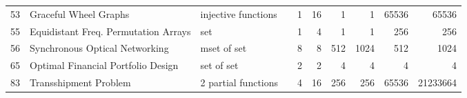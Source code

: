 \begin{sidewaystable}
\begin{center}
\begin{tabular}{r|l|l|l|r|r|r|r|r|r}
 53     &   Graceful Wheel Graphs                                           &   injective functions                                                                                       &   \cite{smith2010constraint}                                           & 1                & 16               & 1                                                    & 1                                     & 65536                                                       & 65536                                                       \\
 55     &   Equidistant Freq. Permutation Arrays                            &   set                                                                                                       &   \cite{huczynska2009modelling}                                        & 1                & 4                & 1                                                    & 1                                     & 256                                                         & 256                                                         \\
 56     &   Synchronous Optical Networking                                  &   mset of set                                                                                               &   \cite{smith2005symmetry}                                             & 8                & 8                & 512                                                  & 1024                                  & 512                                                         & 1024                                                        \\
 65     &   Optimal Financial Portfolio Design                              &   set of set                                                                                                &   \cite{flener2004financial}                                           & 2                & 2                & 4                                                    & 4                                     & 4                                                           & 4                                                           \\
 83     &   Transshipment Problem                                           &   2 partial functions                                                                                       &   \cite{hoppe2000quickest}                                             & 4                & 16               & 256                                                  & 256                                   & 65536                                                       & 21233664                                                    \\

\end{tabular}
\end{center}
\end{sidewaystable}

